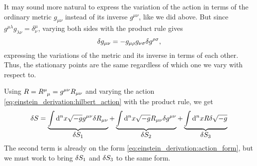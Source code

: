 It may sound more natural to express the variation of the action in terms of the ordinary metric $g_{\mu \nu}$ instead of its inverse $g^{\mu \nu}$, like we did above.
But since $g^{\mu \lambda} g_{\lambda \nu} = \delta^\mu_\nu$, varying both sides with the product rule gives
\begin{equation}
	\delta g_{\mu \nu} = -g_{\mu \rho} g_{\nu \sigma} \delta g^{\rho \sigma} ,
\end{equation}
expressing the variations of the metric and its inverse in terms of each other.
Thus, the stationary points are the same regardless of which one we vary with respect to.

Using $R = R\indices{^\mu_\mu} = g^{\mu \nu} R_{\mu \nu}$ and varying the action \eqref{eq:einstein_derivation:hilbert_action} with the product rule, we get
\begin{equation}
	\delta S = \underbrace{\int \mathop{}\!\mathrm{d}^n x \sqrt{-g} g^{\mu \nu} \delta R_{\mu \nu}}_{\textstyle \delta S_1}
	              + \underbrace{\int \mathop{}\!\mathrm{d}^n x \sqrt{-g} R_{\mu \nu} \delta g^{\mu \nu}}_{\textstyle \delta S_2}
	              + \underbrace{\int \mathop{}\!\mathrm{d}^n x R \delta \sqrt{-g}                      }_{\textstyle \delta S_3}
\end{equation}
The second term is already on the form \eqref{eq:einstein_derivation:action_form}, but we must work to bring $\delta S_1$ and $\delta S_3$ to the same form.

